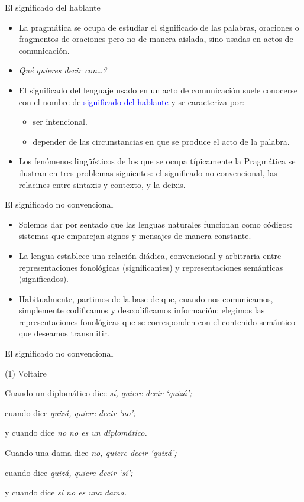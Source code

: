 \documentclass{beamer}
\begin{document}
\begin{frame}{El significado del hablante}

\begin{itemize}
	\item La pragmática se ocupa de estudiar el significado de las palabras, oraciones o fragmentos de oraciones pero no de manera aislada, sino usadas en actos de comunicación.
	\item \it{Qué quieres decir con\ldots?}
	\item El significado del lenguaje usado en un acto de comunicación suele conocerse con el nombre de \textcolor{blue}{significado del hablante} y se caracteriza por:
		\begin{itemize}
			\item ser intencional.
			\item depender de las circunstancias en que se produce el acto de la palabra.
		\end{itemize}
		\item Los fenómenos lingüísticos de los que se ocupa típicamente la Pragmática se ilustran en tres problemas siguientes: el significado no convencional, las relacines entre sintaxis y contexto, y la deixis.
\end{itemize}

\end{frame}


\begin{frame}{El significado no convencional}

\begin{itemize}
	\item Solemos dar por sentado que las lenguas naturales funcionan como códigos: sistemas que emparejan signos y mensajes de manera constante.
	\item La lengua establece una relación diádica, convencional y arbitraria entre representaciones fonológicas (significantes) y representaciones semánticas (significados).
	\item Habitualmente, partimos de la base de que, cuando nos comunicamos, simplemente codificamos y descodificamos información: elegimos las representaciones fonológicas que se corresponden con el contenido semántico que deseamos transmitir.
\end{itemize}

\end{frame}


\begin{frame}{El significado no convencional}

(1) Voltaire

\vspace{0.5cm}

Cuando un diplomático dice \it{sí}, quiere decir `quizá';

cuando dice \it{quizá}, quiere decir `no';

y cuando dice \it{no} no es un diplomático.

Cuando una dama dice \it{no}, quiere decir `quizá';

cuando dice \it{quizá}, quiere decir `sí';

y cuando dice \it{sí} no es una dama.


\end{frame}
\end{document}

